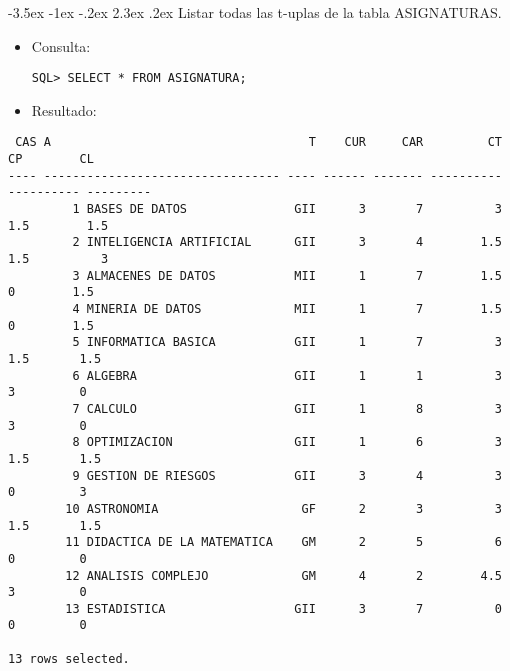 \documentclass[11pt]{report}
\makeatletter
\renewcommand\chapter{\@startsection{chapter}{0}{\z@}%
    {-3.5ex \@plus -1ex \@minus -.2ex}%
    {2.3ex \@plus.2ex}%
    {\normalfont\Large\bfseries}}
\makeatother
\begin{document}
\chapter{Listar todas las t-uplas de la tabla ASIGNATURAS.}
\begin{itemize}
  \item Consulta:
  \begin{verbatim}
SQL> SELECT * FROM ASIGNATURA;
  \end{verbatim}
  \item{Resultado:}
\end{itemize}
  \begin{verbatim}
 CAS A                                    T    CUR     CAR         CT         CP        CL                                                           
---- --------------------------------- ---- ------ ------- ---------- ---------- ---------                                                          
         1 BASES DE DATOS               GII      3       7          3       1.5        1.5                                                           
         2 INTELIGENCIA ARTIFICIAL      GII      3       4        1.5       1.5          3                                                           
         3 ALMACENES DE DATOS           MII      1       7        1.5         0        1.5                                                           
         4 MINERIA DE DATOS             MII      1       7        1.5         0        1.5                                                           
         5 INFORMATICA BASICA           GII      1       7          3        1.5       1.5                                                           
         6 ALGEBRA                      GII      1       1          3          3         0                                                           
         7 CALCULO                      GII      1       8          3          3         0                                                           
         8 OPTIMIZACION                 GII      1       6          3        1.5       1.5                                                           
         9 GESTION DE RIESGOS           GII      3       4          3          0         3                                                           
        10 ASTRONOMIA                    GF      2       3          3        1.5       1.5                                                           
        11 DIDACTICA DE LA MATEMATICA    GM      2       5          6          0         0                                                                                                                      
        12 ANALISIS COMPLEJO             GM      4       2        4.5          3         0                                                           
        13 ESTADISTICA                  GII      3       7          0          0         0                                                           

13 rows selected.
  \end{verbatim}
\end{document}
